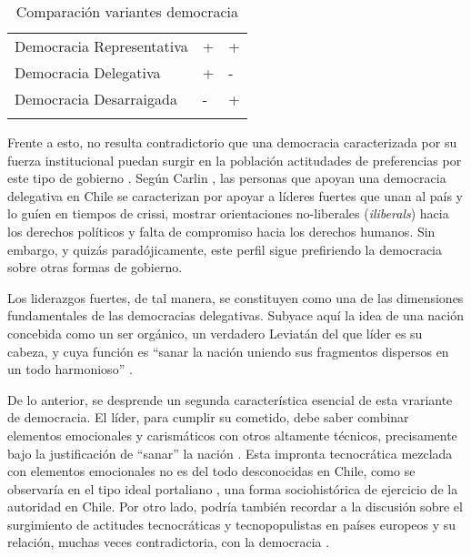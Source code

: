 \documentclass[12pt,twoside]{templates/facsothesis}
\begin{document}
\begin{table}

\caption{\label{tab:unnamed-chunk-3}Comparación variantes democracia}
\centering
\begin{tabu} to 
\toprule
{} &  & \\
\midrule
Democracia Representativa & + & +\\
Democracia Delegativa & + & -\\
Democracia Desarraigada & - & +\\
\bottomrule
{}\\
\end{tabu}
\end{table}

Frente a esto, no resulta contradictorio que una democracia caracterizada por su fuerza institucional puedan surgir en la población actitudades de preferencias por este tipo de gobierno \citep{carlin2011, carlin2018}. Según Carlin \citeyearpar{carlin2018}, las personas que apoyan una democracia delegativa en Chile se caracterizan por apoyar a líderes fuertes que unan al país y lo guíen en tiempos de crissi, mostrar orientaciones no-liberales (\emph{iliberals}) hacia los derechos políticos y falta de compromiso hacia los derechos humanos. Sin embargo, y quizás paradójicamente, este perfil sigue prefiriendo la democracia sobre otras formas de gobierno.

Los liderazgos fuertes, de tal manera, se constituyen como una de las dimensiones fundamentales de las democracias delegativas. Subyace aquí la idea de una nación concebida como un ser orgánico, un verdadero Leviatán del que líder es su cabeza, y cuya función es ``sanar la nación uniendo sus fragmentos dispersos en un todo harmonioso'' \citep[pp.60]{odonnell1994}.

De lo anterior, se desprende un segunda característica esencial de esta vrariante de democracia. El líder, para cumplir su cometido, debe saber combinar elementos emocionales y carismáticos con otros altamente técnicos, precisamente bajo la justificación de ``sanar'' la nación \citep{odonnell1994}. Esta impronta tecnocrática mezclada con elementos emocionales no es del todo desconocidas en Chile, como se observaría en el tipo ideal portaliano \citep{araujo2013}, una forma sociohistórica de ejercicio de la autoridad en Chile. Por otro lado, podría también recordar a la discusión sobre el surgimiento de actitudes tecnocráticas y tecnopopulistas en países europeos y su relación, muchas veces contradictoria, con la democracia \citep{chiru2022, ganuza2020, pilet2023}.
\end{document}
